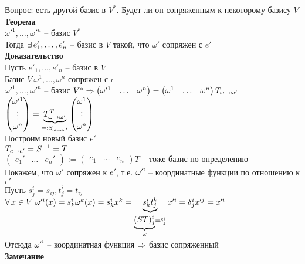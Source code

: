\documentclass[12pt]{article}
\begin{document}
Вопрос: есть другой базис в $V^*$. Будет ли он сопряженным к некоторому базису $V$\\
\textbf{Теорема}\\
$\omega'^1, \ldots, \omega'^n$ -- базис $V^*$\\
Тогда $\ex e'_1, \ldots, e'_n$ -- базис в $V$ такой, что $\omega'$ сопряжен с $e'$\\
\textbf{Доказательство}\\
Пусть $e'_1, \ldots, e'_n$ -- базис в $V$\\
Базис $V\ \omega^1, \ldots, \omega^n$ сопряжен с $e$\\
$\omega'^1, \ldots, \omega'^n$ -- базис $V^* \Rto \begin{pmatrix}
    \omega'^1 & \ldots & \omega^n
\end{pmatrix} = \begin{pmatrix}
    \omega^1 & \ldots & \omega^n
\end{pmatrix}T_{\omega \rto \omega'}$\\
$\begin{pmatrix}
    \omega'^1\\\vdots\\\omega^n
\end{pmatrix} = \ub{=:S_{\omega \rto \omega'}}{T_{\omega \rto \omega'}^T}\begin{pmatrix}
    \omega^1\\\vdots\\\omega^n
\end{pmatrix}$\\
Построим новый базис $e'$\\
$T_{e\rto e'} = S^{-1} = T$\\
$\begin{pmatrix}
    e_1' & \ldots & e_n'
\end{pmatrix}:= \begin{pmatrix}
    e_1 & \ldots & e_n
\end{pmatrix}T$ -- тоже базис по определению\\
Покажем, что $\omega'$ сопряжен к $e'$, т.е. $\omega'^i$ -- координатные функции по отношению к $e'$\\
Пусть $s^i_j = s_{ij}, t^i_j = t_{ij}$\\
$\fall x\in V\ \omega'^i(x) = s^i_k\omega^k(x) = s^i_k x^k = \ub{\ub{E}{(ST)_j^i} = \delta_j^i}{s^i_k t_j^k} x'^i = \delta^i_j x'^j = x'^i$\\
Отсюда $\omega'^i$ -- координатная функция $\Rto$ базис сопряженный\\
\textbf{Замечание}\\
\end{document}
